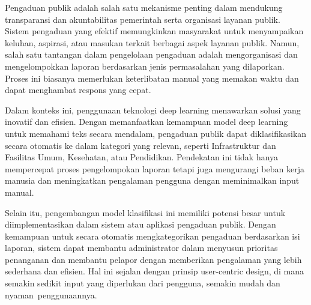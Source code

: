 \documentclass[12pt,a4paper]{article}
\begin{document}
\begin{adjustwidth}{3em}{0pt} 
\hspace{0.5cm} Pengaduan publik adalah salah satu mekanisme penting dalam mendukung transparansi dan akuntabilitas pemerintah serta organisasi layanan publik. Sistem pengaduan yang efektif memungkinkan masyarakat untuk menyampaikan keluhan, aspirasi, atau masukan terkait berbagai aspek layanan publik. Namun, salah satu tantangan dalam pengelolaan pengaduan adalah mengorganisasi dan mengelompokkan laporan berdasarkan jenis permasalahan yang dilaporkan. Proses ini biasanya memerlukan keterlibatan manual yang memakan waktu dan dapat menghambat respons yang cepat.
 
\hspace{0.5cm} Dalam konteks ini, penggunaan teknologi deep learning menawarkan solusi yang inovatif dan efisien. Dengan memanfaatkan kemampuan model deep learning untuk memahami teks secara mendalam, pengaduan publik dapat diklasifikasikan secara otomatis ke dalam kategori yang relevan, seperti Infrastruktur dan Fasilitas Umum, Kesehatan, atau Pendidikan. Pendekatan ini tidak hanya mempercepat proses pengelompokan laporan tetapi juga mengurangi beban kerja manusia dan meningkatkan pengalaman pengguna dengan meminimalkan input manual.

\hspace{0.5cm} Selain itu, pengembangan model klasifikasi ini memiliki potensi besar untuk diimplementasikan dalam sistem atau aplikasi pengaduan publik. Dengan kemampuan untuk secara otomatis mengkategorikan pengaduan berdasarkan isi laporan, sistem dapat membantu administrator dalam menyusun prioritas penanganan dan membantu pelapor dengan memberikan pengalaman yang lebih sederhana dan efisien. Hal ini sejalan dengan prinsip user-centric design, di mana semakin sedikit input yang diperlukan dari pengguna, semakin mudah dan nyaman penggunaannya.
\end{adjustwidth}
\end{document}
